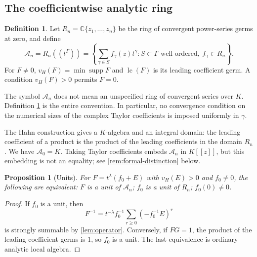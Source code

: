 \documentclass[11pt,letterpaper]{article}
\newtheorem{proposition}[proposition]{Proposition}
\theoremstyle{definition}
\newtheorem{definition}[definition]{Definition}
\theoremstyle{remark}
\newcommand{\C}{\mathbb C}
\newcommand{\A}{\mathscr A}
\newcommand{\supp}{\operatorname{supp}}
\newcommand{\lc}{\operatorname{lc}}
\newcommand{\vH}{v_{\!H}}
\numberwithin{equation}{section}
\begin{document}
\subsection{The coefficientwise analytic ring}
\begin{definition}\label{def:ring}
Let $R_n=\C\{z_1,\ldots,z_n\}$ be the ring of convergent power-series germs at zero, and define
\begin{equation}\label{eq:ring}
 \A_n=R_n((t^\Gamma))
 =\left\{\sum_{\gamma\in S}f_\gamma(z)t^\gamma:
 S\subset\Gamma\text{ well ordered},\ f_\gamma\in R_n\right\}.
\end{equation}
For $F\ne0$, $\vH(F)=\min\supp F$ and $\lc(F)$ is its leading coefficient germ. A condition $\vH(F)>0$ permits $F=0$.
\end{definition}

The symbol $\A_n$ does not mean an unspecified ring of convergent series over $K$. Definition \ref{def:ring} is the entire convention. In particular, no convergence condition on the numerical sizes of the complex Taylor coefficients is imposed uniformly in $\gamma$.

The Hahn construction gives a $K$-algebra and an integral domain: the leading coefficient of a product is the product of the leading coefficients in the domain $R_n$. We have $\A_0=K$. Taking Taylor coefficients embeds $\A_n$ in $K[[z]]$, but this embedding is not an equality; see \cref{rem:formal-distinction} below.

\begin{proposition}[Units]\label{prop:units}
For $F=t^\lambda(f_0+E)$ with $\vH(E)>0$ and $f_0\ne0$, the following are equivalent: $F$ is a unit of $\A_n$; $f_0$ is a unit of $R_n$; $f_0(0)\ne0$.
\end{proposition}
\begin{proof}
If $f_0$ is a unit, then
\[
 F^{-1}=t^{-\lambda}f_0^{-1}
 \sum_{r\ge0}(-f_0^{-1}E)^r
\]
is strongly summable by \cref{lem:operator}. Conversely, if $FG=1$, the product of the leading coefficient germs is $1$, so $f_0$ is a unit. The last equivalence is ordinary analytic local algebra.
\end{proof}
\end{document}
